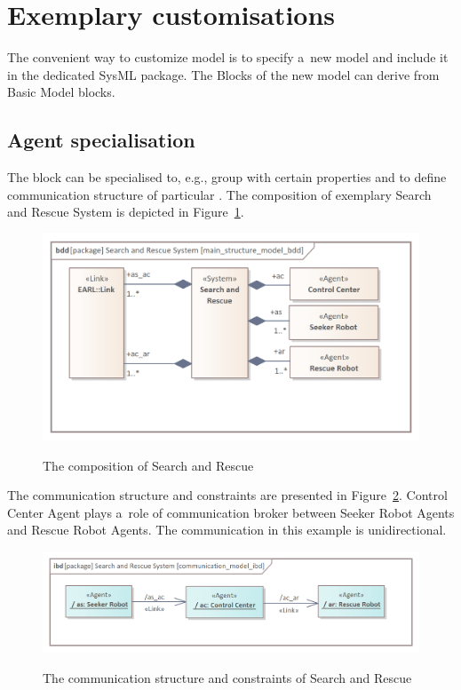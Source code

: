 \documentclass[11pt,oneside,a4paper]{article}
\newcommand{\Figure}[0]{Figure}
\begin{document}
\section{Exemplary \EARL{} customisations}
\label{sec:customisations}

The convenient way to customize \EARL{} model is to specify a~new model and include it in the dedicated SysML package. The Blocks of the new model can derive from Basic Model blocks.

\subsection{Agent specialisation}
\label{ssec:search-and-rescue}

The \Agent{} block can be specialised to, e.g., group \Agents{} with certain properties and to define communication structure of particular \System{}. The composition of exemplary Search and Rescue System is depicted in \Figure{}~\ref{fig:sar_bdd}.


\begin{figure}[H]
	\centering
	\begin{center}
		{\includegraphics[width=0.7\columnwidth]{img/search_and_rescue_system_model/main_structure_model_bdd.png}}
	\end{center}
	\caption{The composition of Search and Rescue \System{}}
	\label{fig:sar_bdd}
\end{figure}

The communication structure and constraints are presented in \Figure{}~\ref{fig:sar_com_con}. Control Center Agent plays a~role of communication broker between Seeker Robot Agents and Rescue Robot Agents. The communication in this example is unidirectional.

\begin{figure}[H]
	\centering
	\begin{center}
		{\includegraphics[width=0.8\columnwidth]{img/search_and_rescue_system_model/communication_model_ibd.png}}
	\end{center}
	\caption{The communication structure and constraints of Search and Rescue \System{}}
	\label{fig:sar_com_con}
\end{figure}
\end{document}
